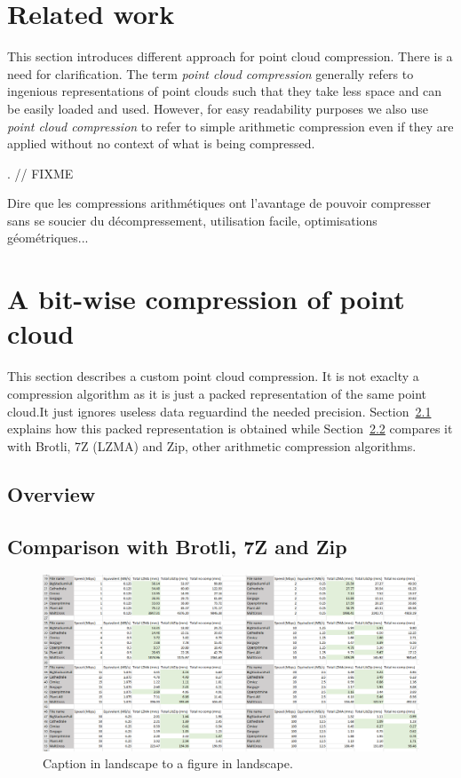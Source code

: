 \section{Related work}
\label{sc:work-compression}
This section introduces different approach for point cloud compression. There is a need for clarification. The term \emph{point cloud compression} generally refers to ingenious representations of point clouds such that they take less space and can be easily loaded and used. However, for easy readability purposes we also use \emph{point cloud compression} to refer to simple arithmetic compression even if they are applied without no context of what is being compressed.

\cite{qsplat, schnabel, gumhold, zhang}. // FIXME\\
\cite{brotli, 7zip}

Dire que les compressions arithmétiques ont l'avantage de pouvoir compresser sans se soucier du décompressement, utilisation facile, optimisations géométriques...

\section{A bit-wise compression of point cloud}
\label{sc:custom-compression}
This section describes a custom point cloud compression. It is not exaclty a compression algorithm as it is just a packed representation of the same point cloud.It just ignores useless data reguardind the needed precision. Section~\ref{subsc:overview-packed} explains how this packed representation is obtained while Section~\ref{subsc:compression-benchmark} compares it with Brotli, 7Z (LZMA) and Zip, other arithmetic compression algorithms.

\subsection{Overview}
\label{subsc:overview-packed}


\subsection{Comparison with Brotli, 7Z and Zip}
\label{subsc:compression-benchmark}

\begin{figure}
    \includegraphics[width=\textwidth]{img/compare1.png}
    \caption{Caption in landscape to a figure in landscape.}
    \label{fig:compare-excel}
\end{figure}



